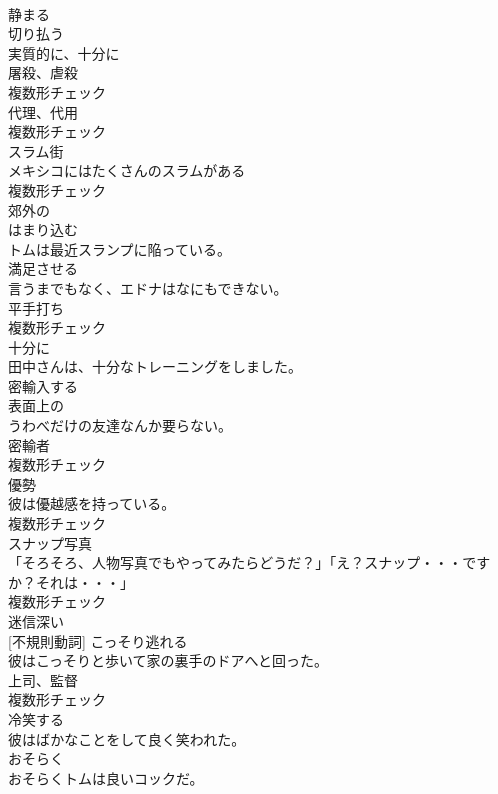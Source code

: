 \documentclass[8pt]{extreport}
\begin{document}
\begin{CJK}{UTF8}{min}
\\	[動詞]	静まる	
\\	[動詞]	切り払う	
\\	[副詞]	実質的に、十分に	
\\	[名詞]	屠殺、虐殺	
\\	複数形チェック
\\	[名詞]	代理、代用	
\\	複数形チェック
\\	[名詞]	スラム街	
\\	メキシコにはたくさんのスラムがある	
\\	複数形チェック
\\	[形容詞]	郊外の	
\\	[動詞]	はまり込む	
\\	トムは最近スランプに陥っている。	
\\	[動詞]	満足させる	
\\	言うまでもなく、エドナはなにもできない。	
\\	[名詞]	平手打ち	
\\	複数形チェック
\\	[副詞]	十分に	
\\	田中さんは、十分なトレーニングをしました。	
\\	[動詞]	密輸入する	
\\	[形容詞]	表面上の	
\\	うわべだけの友達なんか要らない。	
\\	[名詞]	密輸者	
\\	複数形チェック
\\	[名詞]	優勢	
\\	彼は優越感を持っている。	
\\	複数形チェック
\\	[名詞]	スナップ写真	
\\	「そろそろ、人物写真でもやってみたらどうだ？」「え？スナップ・・・ですか？それは・・・」	
\\	複数形チェック
\\	[形容詞]	迷信深い	
\\	[動詞] [不規則動詞]	こっそり逃れる	
\\	彼はこっそりと歩いて家の裏手のドアへと回った。	
\\	[名詞]	上司、監督	
\\	複数形チェック
\\	[動詞]	冷笑する	
\\	彼はばかなことをして良く笑われた。	
\\	[副詞]	おそらく	
\\	おそらくトムは良いコックだ。	

\end{CJK}
\end{document}
